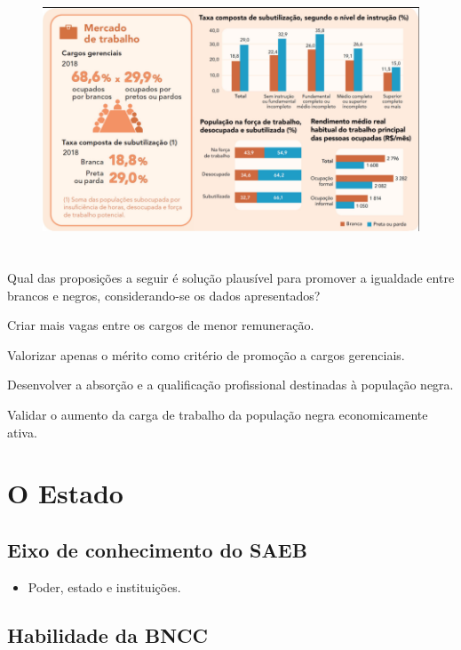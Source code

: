 \begin{figure}
\centering
\includegraphics[width=5.27586in,height=3.12929in]{./imgSAEB_9_CHUM3/media/image3.png}
\end{figure}

Qual das proposições a seguir é solução plausível para promover a
igualdade entre brancos e negros, considerando-se os dados apresentados?

\begin{escolha}
\item
  Criar mais vagas entre os cargos de menor remuneração.
\item
  Valorizar apenas o mérito como critério de promoção a cargos
  gerenciais.
\item
  Desenvolver a absorção e a qualificação profissional destinadas à
  população negra.
\item
  Validar o aumento da carga de trabalho da população negra
  economicamente ativa.
\end{escolha}

\chapter{O Estado}

\section{Eixo de conhecimento do SAEB}

\begin{itemize}
  \item 
Poder, estado e instituições.
\end{itemize}

\section{Habilidade da BNCC}

